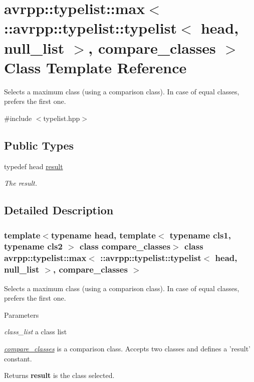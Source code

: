 \hypertarget{classavrpp_1_1typelist_1_1max_3_01_1_1avrpp_1_1typelist_1_1typelist_3_01head_00_01null__list_01_4_00_01compare__classes_01_4}{
\section{avrpp::typelist::max$<$ ::avrpp::typelist::typelist$<$ head, null\_\-list $>$, compare\_\-classes $>$ Class Template Reference}
\label{classavrpp_1_1typelist_1_1max_3_01_1_1avrpp_1_1typelist_1_1typelist_3_01head_00_01null__list_01_4_00_01compare__classes_01_4}
}


Selects a maximum class (using a comparison class). In case of equal classes, prefers the first one.  




{\ttfamily \#include $<$typelist.hpp$>$}

\subsection*{Public Types}
\begin{DoxyCompactItemize}
\item 
typedef head \hyperlink{classavrpp_1_1typelist_1_1max_3_01_1_1avrpp_1_1typelist_1_1typelist_3_01head_00_01null__list_01_4_00_01compare__classes_01_4_adac54fbc2af6f9342135124b2a5c3144}{result}
\begin{DoxyCompactList}\small\item\em The result. \item\end{DoxyCompactList}\end{DoxyCompactItemize}


\subsection{Detailed Description}
\subsubsection*{template$<$typename head, template$<$ typename cls1, typename cls2 $>$ class compare\_\-classes$>$ class avrpp::typelist::max$<$ ::avrpp::typelist::typelist$<$ head, null\_\-list $>$, compare\_\-classes $>$}

Selects a maximum class (using a comparison class). In case of equal classes, prefers the first one. 
\begin{DoxyParams}{Parameters}
\item[{\em class\_\-list}]a class list \item[{\em \hyperlink{structavrpp_1_1typelist_1_1compare__classes}{compare\_\-classes}}]is a comparison class. Accepts two classes and defines a 'result' constant. \end{DoxyParams}
\begin{DoxyReturn}{Returns}
{\bfseries result} is the class selected. 
\end{DoxyReturn}


